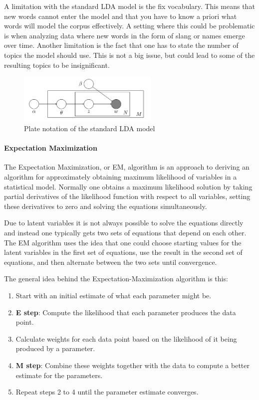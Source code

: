 \documentclass[12pt]{report}
\begin{document}
A limitation with the standard LDA model is the fix vocabulary. This means that
new words cannot enter the model and that you have to know a priori what words
will model the corpus effectively. A setting where this could be problematic is
when analyzing data where new words in the form of slang or names emerge over 
time. Another limitation is the fact that one has to state
the number of topics the model should use. This is not a big issue, but could
lead to some of the resulting topics to be insignificant.
\begin{center}
\begin{figure}[h]
\centering
\includegraphics[width=0.6\textwidth]{figs/LDA_standard_model.png}
\caption{Plate notation of the standard LDA model}
\end{figure}
\end{center}

\paragraph{Expectation Maximization}

The Expectation Maximization, or EM, algorithm is an approach to deriving an
algorithm for approximately obtaining maximum likelihood of variables in a
statistical model. Normally one obtains a maximum likelihood solution by taking
partial derivatives of the likelihood function with respect to all variables,
setting these derivatives to zero and solving the equations simultaneously.
\cite{Myung:2003}

Due to latent variables it is not always possible to solve the equations
directly and instead one typically gets two sets of equations that depend on
each other. The EM algorithm uses the idea that one could choose starting
values for the latent variables in the first set of equations, use the result
in the second set of equations, and then alternate between the two sets until
convergence.

The general idea behind the Expectation-Maximization algorithm is this:

\begin{enumerate}
\item Start with an initial estimate of what each parameter might be.
\item \textbf{E step}: Compute the likelihood that each parameter produces 
the data point.
\item Calculate weights for each data point based on the likelihood of it 
being produced by a parameter.
\item \textbf{M step}: Combine these weights together with the data to 
compute a better estimate for the parameters.
\item Repeat steps 2 to 4 until the parameter estimate converges.
\end{enumerate}
\end{document}
